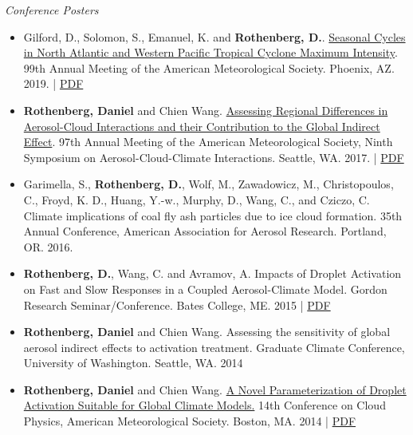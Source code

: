 \documentclass[11pt,letterpaper]{article}
\begin{document}
\bigskip
\emph{Conference Posters}
\medskip
\begin{itemize}[itemindent=-10pt]

 \item Gilford, D., Solomon, S., Emanuel, K. and \textbf{Rothenberg, D.}. \href{https://ams.confex.com/ams/2019Annual/meetingapp.cgi/Paper/349989}{Seasonal Cycles in North Atlantic and Western Pacific Tropical Cyclone Maximum Intensity}. 99th Annual Meeting of the American Meteorological Society. Phoenix, AZ. 2019.  | \href{file:///Users/daniel/Downloads/2018AMSTropicalMeetingPoster_v8.pdf}{PDF}

 \item \textbf{Rothenberg, Daniel} and Chien Wang. \href{https://app.core-apps.com/ams2017/abstract/15b6ce6f2a9ba4be8e489d83ea69e909}{Assessing Regional Differences in Aerosol-Cloud Interactions and their Contribution to the Global Indirect Effect}. 97th Annual Meeting of the American Meteorological Society, Ninth Symposium on Aerosol-Cloud-Climate Interactions. Seattle, WA. 2017. | \href{https://figshare.com/s/f7bef67cb5d120e17a96}{PDF}

 \item Garimella, S., \textbf{Rothenberg, D.}, Wolf, M., Zawadowicz, M., Christopoulos, C., Froyd, K. D., Huang, Y.-w., Murphy, D., Wang, C., and Cziczo, C. Climate implications of coal fly ash particles due to ice cloud formation. 35th Annual Conference, American Association for Aerosol Research. Portland, OR. 2016.

 \item \textbf{Rothenberg, D.}, Wang, C. and Avramov, A. Impacts of Droplet Activation on Fast and Slow Responses in a Coupled Aerosol-Climate Model. Gordon Research Seminar/Conference. Bates College, ME. 2015 | \href{http://figshare.com/articles/poster_pdf/1534717}{PDF}

 \item \textbf{Rothenberg, Daniel} and Chien Wang. Assessing the sensitivity of global aerosol indirect effects to activation treatment. Graduate Climate Conference, University of Washington. Seattle, WA. 2014

 \item \textbf{Rothenberg, Daniel} and Chien Wang. \href{https://ams.confex.com/ams/14CLOUD14ATRAD/webprogram/Paper250349.html}{A Novel Parameterization of Droplet Activation Suitable for Global Climate Models.} 14th Conference on Cloud Physics, American Meteorological Society. Boston, MA. 2014 |  \href{http://figshare.com/articles/A_Novel_Parameterization_of_Droplet_Activation_Suitable_for_Global_Climate_Models/1085984}{PDF}


\end{itemize}
\end{document}
